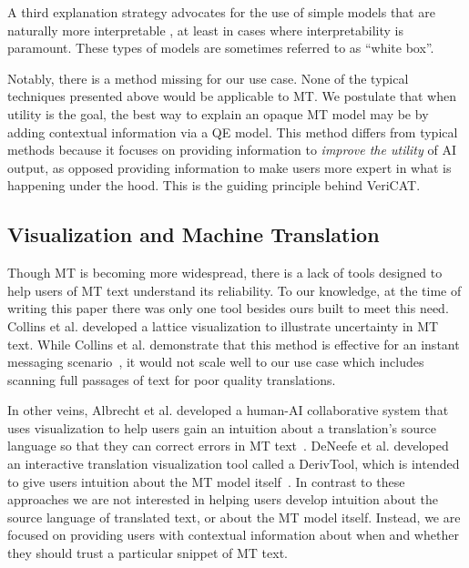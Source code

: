 A third explanation strategy advocates for the use of simple models that are naturally more interpretable \cite{rudin2018stop}, at least in cases where interpretability is paramount. These types of models are sometimes referred to as “white box”. %

Notably, there is a method missing for our use case. None of the typical techniques presented above would be applicable to MT. We postulate that when utility is the goal, the best way to explain an opaque MT model may be by adding contextual information via a QE model. This method differs from typical methods because it focuses on providing information to \textit{improve the utility} of AI output, as opposed providing information to make users more expert in what is happening under the hood. This is the guiding principle behind VeriCAT.   

\subsection{Visualization and Machine Translation}

Though MT is becoming more widespread, there is a lack of tools designed to help users of MT text understand its reliability. To our knowledge, at the time of writing this paper there was only one tool besides ours built to meet this need. Collins et al. developed a lattice visualization to illustrate uncertainty in MT text. While Collins et al. demonstrate that this method is effective for an instant messaging scenario~\cite{collins2007lattices}, it would not scale well to our use case which includes scanning full passages of text for poor quality translations.   

In other veins, Albrecht et al. developed a human-AI collaborative system that uses visualization to help users gain an intuition about a translation's source language so that they can correct errors in MT text~\cite{albrecht2009chinese}. 
DeNeefe et al. developed an interactive translation
visualization tool called a DerivTool, which is intended to give users intuition about the MT model itself~\cite{deneefe2005interactively}. In contrast to these approaches we are not interested in helping users develop intuition about the source language of translated text, or about the MT model itself. Instead, we are focused on providing users with contextual information about when and whether they should trust a particular snippet of MT text. 



